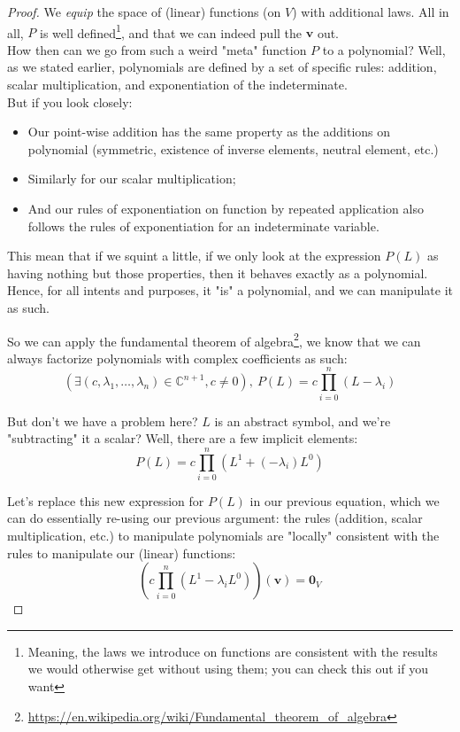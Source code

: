\documentclass[solutions.tex]{subfiles}
\renewcommand{\bm}[1]{\pmb{#1}}
\begin{document}
\begin{proof}
We \textit{equip} the space of (linear) functions (on $V$) with
additional laws. All in all, $P$ is well defined\footnote{Meaning,
the laws we introduce on functions are consistent with the results
we would otherwise get without using them; you can check this out
if you want}, and that we can indeed pull the $\bm{v}$ out. \\

How then can we go from such a weird "meta" function $P$ to a
polynomial? Well, as we stated earlier, polynomials are defined
by a set of specific rules: addition, scalar multiplication,
and exponentiation of the indeterminate. \\

But if you look closely:
\begin{itemize}
	\item Our point-wise addition has the same property as
	the additions on polynomial (symmetric, existence of inverse
	elements, neutral element, etc.)
	\item Similarly for our scalar multiplication;
	\item And our rules of exponentiation on function by repeated
	application also follows the rules of exponentiation for
	an indeterminate variable.
\end{itemize}

This mean that if we squint a little, if we only look at the
expression $P(L)$ as having nothing but those properties, then
it behaves exactly as a polynomial. Hence, for all intents and
purposes, it "is" a polynomial, and we can manipulate it as such.

So we can apply the fundamental theorem of algebra\footnote{
\url{https://en.wikipedia.org/wiki/Fundamental\_theorem\_of\_algebra}},
we know that we can always factorize polynomials with
complex coefficients as such:
\[
	(\exists (c, \lambda_1, \ldots, \lambda_n)\in\mathbb{C}^{n+1}, c\neq 0),\
		P(L) = c\prod_{i=0}^n (L-\lambda_i)
\]

But don't we have a problem here? $L$ is an abstract symbol, and we're
"subtracting" it a scalar? Well, there are a few implicit elements:
\[
	P(L) = c\prod_{i=0}^n (L^1 + (-\lambda_i)L^0)
\]

Let's replace this new expression for $P(L)$ in our previous equation,
which we can do essentially re-using our previous argument: the
rules (addition, scalar multiplication, etc.) to manipulate polynomials
are "locally" consistent with the rules to manipulate our (linear) functions:
\[
	\left(c\prod_{i=0}^n (L^1-\lambda_i L^0)\right)(\bm{v}) = \bm{0}_V
\]


\end{proof}
\end{document}
